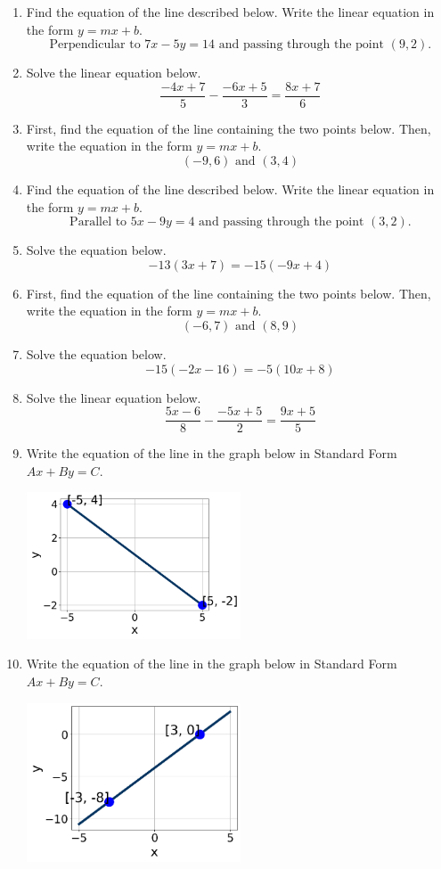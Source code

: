 \documentclass[14pt]{extbook}
\begin{document}
\begin{enumerate}
{\begin{center}
\end{center}
} \newpage
\item{
Find the equation of the line described below. Write the linear equation in the form $y=mx+b$.\[ \text{Perpendicular to } 7 x - 5 y = 14 \text{ and passing through the point } (9, 2). \]} \newpage
\item{
Solve the linear equation below.\[ \frac{-4x + 7}{5} - \frac{-6x + 5}{3} = \frac{8x + 7}{6} \]} \newpage
\item{
First, find the equation of the line containing the two points below. Then, write the equation in the form $ y=mx+b $.\[ (-9, 6) \text{ and } (3, 4) \]} \newpage
\item{
Find the equation of the line described below. Write the linear equation in the form $y=mx+b$.\[ \text{Parallel to } 5 x - 9 y = 4 \text{ and passing through the point } (3, 2). \]} \newpage
\item{
Solve the equation below.\[ -13(3x + 7) = -15(-9x + 4) \]} \newpage
\item{
First, find the equation of the line containing the two points below. Then, write the equation in the form $ y=mx+b $.\[ (-6, 7) \text{ and } (8, 9) \]} \newpage
\item{
Solve the equation below.\[ -15(-2x -16) = -5(10x + 8) \]} \newpage
\item{
Solve the linear equation below.\[ \frac{5x -6}{8} - \frac{-5x + 5}{2} = \frac{9x + 5}{5} \]} \newpage
\item{
Write the equation of the line in the graph below in Standard Form $Ax+By=C$.
\begin{center}
    \includegraphics[width=0.5\textwidth]{../Figures/linearGraphToStandardC.png}
\end{center}
} \newpage
\item{
Write the equation of the line in the graph below in Standard Form $Ax+By=C$.
\begin{center}
    \includegraphics[width=0.5\textwidth]{../Figures/linearGraphToStandardCopyC.png}

\end{center}}
\end{enumerate}
\end{document}
